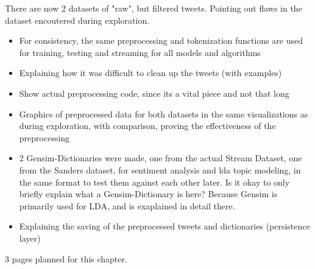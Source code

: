 There are now 2 datasets of "raw", but filtered tweets.
Pointing out flaws in the dataset encoutered during exploration.

\begin{itemize}
    \item
    For consistency, the same preprocessing and tokenization functions are used for training, testing and streaming for all models and algorithms
    \item
    Explaining how it was difficult to clean up the tweets (with examples)
    \item
    Show actual preprocessing code, since its a vital piece and not that long
    \item
    Graphics of preprocessed data for both datasets in the same visualizations as during exploration, with comparison, proving the effectiveness of the preprocessing
    \item
    2 Gensim-Dictionaries were made, one from the actual Stream Dataset, one from the Sanders dataset, for sentiment analysis and lda topic modeling, in the same format to test them against each other later.
    Is it okay to only briefly explain what a Gensim-Dictionary is here?
    Because Gensim is primarily used for LDA, and is exaplained in detail there.
    \item
    Explaining the saving of the preprocessed tweets and dictionaries (persistence layer)
\end{itemize}

3 pages planned for this chapter.
\pagebreak[3]
